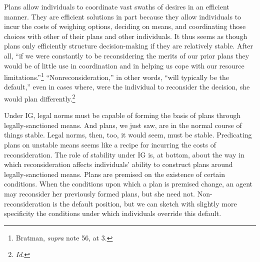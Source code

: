 Plans allow individuals to coordinate vast swaths of desires in an
efficient manner. They are efficient solutions in part because they
allow individuals to incur the costs of weighing options, deciding on
means, and coordinating those choices with other of their plans and
other individuals. It thus seems as though plans only efficiently
structure decision-making if they are relatively stable. After all, ``if
we were constantly to be reconsidering the merits of our prior plans
they would be of little use in coordination and in helping us cope with
our resource limitations.''\footnote{Bratman, \emph{supra} note 56, at
  3.} ``Nonreconsideration,'' in other words, ``will typically be the
default,'' even in cases where, were the individual to reconsider the
decision, she would plan differently.\footnote{\emph{Id}.}

Under IG, legal norms must be capable of forming the basis of plans
through legally-sanctioned means. And plans, we just saw, are in the
normal course of things stable. Legal norms, then, too, it would seem,
must be stable. Predicating plans on unstable means seems like a recipe
for incurring the costs of reconsideration. The role of stability under
IG is, at bottom, about the way in which reconsideration affects
individuals' ability to construct plans around legally-sanctioned means.
Plans are premised on the existence of certain conditions. When the
conditions upon which a plan is premised change, an agent may reconsider
her previously formed plans, but she need not. Non-reconsideration is
the default position, but we can sketch with slightly more specificity
the conditions under which individuals override this default.

